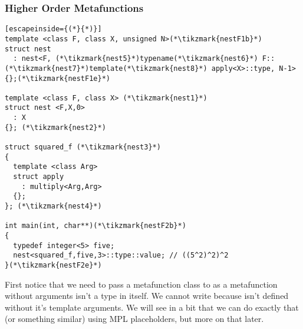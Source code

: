 \documentclass[11pt,a4paper,dvipsnames,usenames]{beamer}
\begin{document}
\begin{frame}[fragile]
  \frametitle{Higher Order Metafunctions}

  \vfill

  \begin{lstlisting}[escapeinside={(*}{*)}]
template <class F, class X, unsigned N>(*\tikzmark{nestF1b}*)
struct nest
  : nest<F, (*\tikzmark{nest5}*)typename(*\tikzmark{nest6}*) F::(*\tikzmark{nest7}*)template(*\tikzmark{nest8}*) apply<X>::type, N-1>
{};(*\tikzmark{nestF1e}*)

template <class F, class X> (*\tikzmark{nest1}*)
struct nest <F,X,0>
  : X
{}; (*\tikzmark{nest2}*)

struct squared_f (*\tikzmark{nest3}*)
{
  template <class Arg>
  struct apply
    : multiply<Arg,Arg>
  {};
}; (*\tikzmark{nest4}*)

int main(int, char**)(*\tikzmark{nestF2b}*)
{
  typedef integer<5> five;
  nest<squared_f,five,3>::type::value; // ((5^2)^2)^2 
}(*\tikzmark{nestF2e}*)
  \end{lstlisting}





  {
    First notice that we need to pass a metafunction class to  as a metafunction without arguments isn't a type
    in itself. We cannot write  because  isn't defined without it's template
    arguments. We will see in a bit that we can do exactly that (or something similar) using MPL placeholders, but more on that
    later.
  }

\end{frame}
\end{document}
